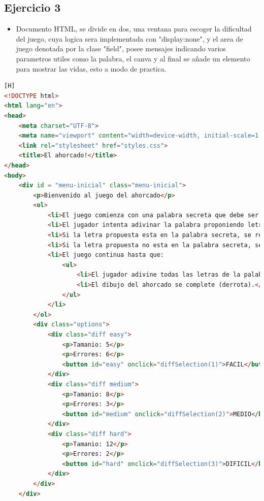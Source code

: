 \documentclass{article}
\begin{document}
		
		\subsection{Ejercicio 3}
	\begin{itemize}	
		\item Documento HTML, se divide en dos, una ventana para escoger la dificultad del juego, cuya logica sera implementada con "display:none", y el area de juego denotada por la clase "field", posee mensajes indicando varios parametros utiles como la palabra, el canva y al final se añade un elemento para mostrar las vidas, esto a modo de practica.
	\end{itemize}	
		
	\begin{lstlisting}[language=html,caption={Ejercicio3/index.html}][H]
<!DOCTYPE html>
<html lang="en">
<head>
    <meta charset="UTF-8">
    <meta name="viewport" content="width=device-width, initial-scale=1.0">
    <link rel="stylesheet" href="styles.css">
    <title>El ahorcado!</title>
</head>
<body>
    <div id = "menu-inicial" class="menu-inicial">
        <p>Bienvenido al juego del ahorcado</p>
        <ol>
            <li>El juego comienza con una palabra secreta que debe ser adivinada.</li>
            <li>El jugador intenta adivinar la palabra proponiendo letras, una a la vez.</li>
            <li>Si la letra propuesta esta en la palabra secreta, se revela en su posicion correspondiente.</li>
            <li>Si la letra propuesta no esta en la palabra secreta, se agrega una parte del dibujo del ahorcado.</li>
            <li>El juego continua hasta que:
                <ul>
                    <li>El jugador adivine todas las letras de la palabra (victoria), o</li>
                    <li>El dibujo del ahorcado se complete (derrota).</li>
                </ul>
            </li>
        </ol>
        <div class="options">
            <div class="diff easy">
                <p>Tamanio: 5</p>
                <p>Errores: 6</p>
                <button id="easy" onclick="diffSelection(1)">FACIL</button>
            </div>
            <div class="diff medium">
                <p>Tamanio: 8</p>
                <p>Errores: 3</p>
                <button id="medium" onclick="diffSelection(2)">MEDIO</button>
            </div>
            <div class="diff hard">
                <p>Tamanio: 12</p>
                <p>Errores: 2</p>
                <button id="hard" onclick="diffSelection(3)">DIFICIL</button>
            </div>
        </div>
    </div>


\end{lstlisting}
\end{document}
